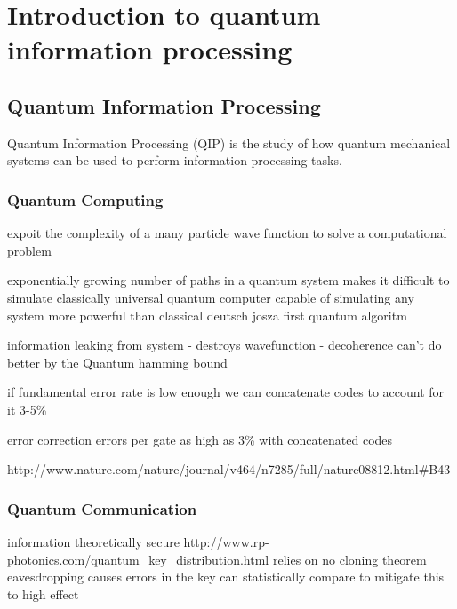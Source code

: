 \chapter{Introduction to quantum information processing} 
\label{ch:Introduction}

\section{Quantum Information Processing}

Quantum Information Processing (QIP) is the study of how quantum mechanical systems can be used to perform information processing tasks. 

\subsection{Quantum Computing}

expoit the complexity of a many particle wave function to solve a computational problem

\cite{feynman_82} exponentially growing number of paths in a quantum system makes it difficult to simulate classically
\cite{deutsch_85} universal quantum computer capable of simulating any system more powerful than classical
\cite{deutsch_jozsa_92} deutsch josza first quantum algoritm

\cite{shors_algorithm}
\cite{grovers_search}

information leaking from system - destroys wavefunction - decoherence
\cite{shor_codes_95}
\cite{steane_code_96, steane_code_96_2}
\cite{laflamme_5_code} can't do better by the Quantum hamming bound

\cite{stabiliser_codes_97, stabiliser_codes_96}
\cite{quantum_threshold_theorem} if fundamental error rate is low enough we can concatenate codes to account for it 3-5\%

error correction \cite{knill_correction} errors per gate as high as 3\% with concatenated codes
 
\cite{nature_cq_review_10} http://www.nature.com/nature/journal/v464/n7285/full/nature08812.html#B43

\subsection{Quantum Communication}
information theoretically secure
http://www.rp-photonics.com/quantum_key_distribution.html 
\cite{bennet_brassard_84} relies on no cloning theorem \cite{no_cloning}
eavesdropping causes errors in the key
can statistically compare to mitigate this to high effect

